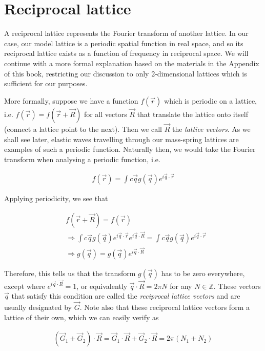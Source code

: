 \section{Reciprocal lattice}
\label{reclatbg}
A reciprocal lattice represents the Fourier transform of another lattice. In
our case, our model lattice is a periodic spatial function in real space, and
so its reciprocal lattice exists as a function of frequency in reciprocal
space.  We will continue with a more formal explanation based on the materials
in the Appendix of this book,\cite{moldinglight} restricting our discussion to
only 2-dimensional lattices which is sufficient for our purposes.

More formally, suppose we have a function $f(\vec{r})$ which is periodic on a
lattice, i.e. $f(\vec{r})=f(\vec{r}+\vec{R})$ for all vectors $\vec{R}$
that translate the lattice onto itself (connect a lattice point to the next).
Then we call $\vec{R}$ the \textit{lattice vectors}. As we shall see later,
elastic waves travelling through our mass-spring lattices are examples of such
a periodic function. Naturally then, we would take the Fourier transform when analysing a periodic function, i.e.

\begin{align}
  f(\vec{r})=\int c\vec{q}g(\vec{q})e^{i\vec{q}\cdot\vec{r}}
\end{align}

Applying periodicity, we see that

\begin{align}
  &f(\vec{r}+\vec{R})=f(\vec{r}) \\
  &\Rightarrow\int c\vec{q}g(\vec{q})e^{i\vec{q}\cdot\vec{r}}e^{i\vec{q}\cdot\vec{R}}=\int c\vec{q}g(\vec{q})e^{i\vec{q}\cdot\vec{r}} \\
  &\Rightarrow g(\vec{q})=g(\vec{q})e^{i\vec{q}\cdot\vec{R}}
\end{align}

Therefore, this tells us that the transform $g(\vec{q})$ has to be zero
everywhere, except where $e^{i\vec{q}\cdot\vec{R}}=1$, or equivalently
$\vec{q}\cdot\vec{R}=2\pi N$ for any $N\in \mathbb{Z}$. These vectors $\vec{q}$ that
satisfy this condition are called the \textit{reciprocal lattice vectors} and
are usually designated by $\vec{G}$. Note also that these reciprocal lattice
vectors form a lattice of their own, which we can easily verify as

\begin{align}
(\vec{G}_1+\vec{G}_2)\cdot\vec{R}=\vec{G}_1\cdot\vec{R}+\vec{G}_2\cdot\vec{R}=2\pi (N_1+N_2)
\end{align}
 
